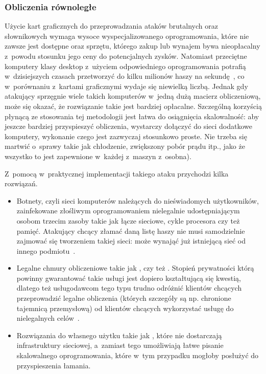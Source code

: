 \subsubsection{Obliczenia równoległe}

Użycie kart graficznych do przeprowadzania ataków brutalnych oraz słownikowych
wymaga wysoce wyspecjalizowanego oprogramowania, które nie zawsze jest dostępne
oraz sprzętu, którego zakup lub wynajem bywa nieopłacalny z~powodu stosunku
jego ceny do potencjalnych zysków. Natomiast przeciętne komputery klasy desktop
z~użyciem odpowiedniego oprogramowania potrafią w~dzisiejszych czasach
przetworzyć do kilku milionów haszy na
sekundę~\cite{oclhashcat,john_the_ripper_benchmarks}, co w~porównaniu z~kartami
graficznymi wydaje się niewielką liczbą. Jednak gdy atakujący sprzęgnie wiele
takich komputerów w~jedną dużą macierz obliczeniową, może się okazać, że
rozwiązanie takie jest bardziej opłacalne. Szczególną korzyścią płynącą ze
stosowania tej metodologii jest łatwa do osiągnięcia skalowalność: aby jeszcze
bardziej przyspieszyć obliczenia, wystarczy dołączyć do sieci dodatkowe
komputery, wykonanie czego jest zazwyczaj stosunkowo proste. Nie trzeba się
martwić o~sprawy takie jak chłodzenie, zwiększony pobór prądu itp., jako że
wszystko to jest zapewnione w~każdej z~maszyn z~osobna).

Z~pomocą w~praktycznej implementacji takiego ataku przychodzi kilka rozwiązań.

\begin{itemize}

    \item Botnety, czyli sieci komputerów należących do nieświadomych
    użytkowników, zainfekowane złośliwym oprogramowaniem nielegalnie
    udostępniającym osobom trzecim zasoby takie jak łącze sieciowe, cykle
    procesora czy też pamięć. Atakujący chcący złamać daną listę haszy nie musi
    samodzielnie zajmować się tworzeniem takiej sieci: może wynająć już
    istniejącą sieć od innego podmiotu~\cite{botnet_rental,botnet_rental2}.

    \item Legalne chmury obliczeniowe takie jak ,
     czy też . Stopień
    prywatności którą powinny gwarantować takie usługi jest dopiero
    kształtującą się kwestią, dlatego też usługodawcom tego typu trudno
    odróżnić klientów chcących przeprowadzić legalne obliczenia (których
    szczegóły są np. chronione tajemnicą przemysłową) od klientów chcących
    wykorzystać usługę do nielegalnych celów~\cite{cloud_criminals}.

    \item Rozwiązania do własnego użytku takie jak , które nie
    dostarczają infrastruktury sieciowej, a~zamiast tego umożliwiają łatwe
    pisanie skalowalnego oprogramowania, które w~tym przypadku mogłoby posłużyć
    do przyspieszenia łamania.

\end{itemize}

